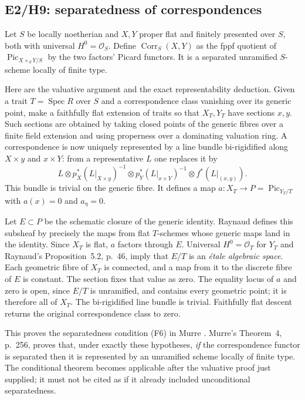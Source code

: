 \subsection{E2/H9: separatedness of correspondences}

Let $S$ be locally noetherian and $X,Y$ proper flat and finitely presented
over $S$, both with universal $H^0=\mathcal O_S$. Define $\operatorname{Corr}_S(X,Y)$
as the fppf quotient of $\operatorname{Pic}_{X\times_SY/S}$ by the two factors'
Picard functors. It is a separated unramified $S$-scheme locally of finite type.

Here are the valuative argument and the exact representability deduction.
Given a trait $T=\operatorname{Spec}R$ over $S$ and a correspondence class
vanishing over its generic point, make a faithfully flat extension of traits
so that $X_T,Y_T$ have sections $x,y$. Such sections are obtained by taking
closed points of the generic fibres over a finite field extension and using
properness over a dominating valuation ring. A correspondence is now uniquely
represented by a line bundle bi-rigidified along $X\times y$ and $x\times Y$:
from a representative $L$ one replaces it by
\[
 L\otimes p_X^*(L|_{X\times y})^{-1}
  \otimes p_Y^*(L|_{x\times Y})^{-1}
  \otimes f^*(L|_{(x,y)}).
\]
This bundle is trivial on the generic fibre. It defines a map
$a:X_T\to P=\operatorname{Pic}_{Y_T/T}$ with $a(x)=0$ and $a_\eta=0$.

Let $E\subset P$ be the schematic closure of the generic identity.
Raynaud \cite[\S3.2(c), p.~40]{Raynaud1970} defines this subsheaf by precisely
the maps from flat $T$-schemes whose generic maps land in the identity.
Since $X_T$ is flat, $a$ factors through $E$. Universal $H^0=\mathcal O_T$
for $Y_T$ and Raynaud's Proposition~5.2, p.~46, imply that $E/T$ is an
\emph{\'etale algebraic space}. Each geometric fibre of $X_T$ is connected,
and a map from it to the discrete fibre of $E$ is constant. The section fixes
that value as zero. The equality locus of $a$ and zero is open, since $E/T$
is unramified, and contains every geometric point; it is therefore all of
$X_T$. The bi-rigidified line bundle is trivial. Faithfully flat descent
returns the original correspondence class to zero.

This proves the separatedness condition (F6) in Murre
\cite[p.~245]{Murre1966}. Murre's Theorem~4, p.~256, proves that, under exactly
these hypotheses, \emph{if} the correspondence functor is separated then it
is represented by an unramified scheme locally of finite type. The conditional
theorem becomes applicable after the valuative proof just supplied; it must
not be cited as if it already included unconditional separatedness.

